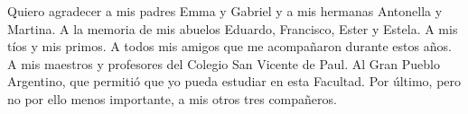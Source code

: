 Quiero agradecer a mis padres Emma y Gabriel y a mis hermanas Antonella y Martina. A la memoria de mis abuelos Eduardo, 
Francisco, Ester y Estela. A mis tíos y mis primos. A todos mis amigos que me acompañaron durante estos años. A mis 
maestros y profesores del Colegio San Vicente de Paul. Al Gran Pueblo Argentino, que permitió que yo pueda estudiar en 
esta Facultad. Por último, pero no por ello menos importante, a mis otros tres compañeros.
